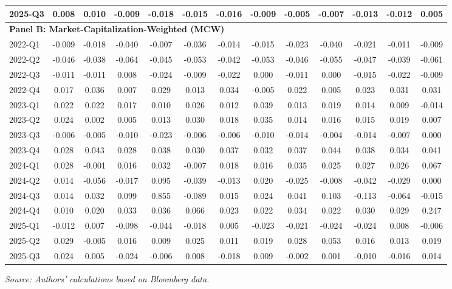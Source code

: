 \documentclass[12pt]{article}
\begin{document}
\begin{table}[htbp]
\begin{adjustbox}{max width=\textwidth}
\begin{tabular}{lcccccccccccc}
2025-Q3 & 0.008 & 0.010 & -0.009 & -0.018 & -0.015 & -0.016 & -0.009 & -0.005 & -0.007 & -0.013 & -0.012 & 0.005 \\
\midrule
\multicolumn{13}{l}{\textbf{Panel B: Market-Capitalization-Weighted (MCW)}} \\
\midrule
2022-Q1 & -0.009 & -0.018 & -0.040 & -0.007 & -0.036 & -0.014 & -0.015 & -0.023 & -0.040 & -0.021 & -0.011 & -0.009 \\
2022-Q2 & -0.046 & -0.038 & -0.064 & -0.045 & -0.053 & -0.042 & -0.053 & -0.046 & -0.055 & -0.047 & -0.039 & -0.061 \\
2022-Q3 & -0.011 & -0.011 & 0.008 & -0.024 & -0.009 & -0.022 & 0.000 & -0.011 & 0.000 & -0.015 & -0.022 & -0.009 \\
2022-Q4 & 0.017 & 0.036 & 0.007 & 0.029 & 0.013 & 0.034 & -0.005 & 0.022 & 0.005 & 0.023 & 0.031 & 0.031 \\
2023-Q1 & 0.022 & 0.022 & 0.017 & 0.010 & 0.026 & 0.012 & 0.039 & 0.013 & 0.019 & 0.014 & 0.009 & -0.014 \\
2023-Q2 & 0.024 & 0.002 & 0.005 & 0.013 & 0.030 & 0.018 & 0.035 & 0.014 & 0.016 & 0.015 & 0.019 & 0.007 \\
2023-Q3 & -0.006 & -0.005 & -0.010 & -0.023 & -0.006 & -0.006 & -0.010 & -0.014 & -0.004 & -0.014 & -0.007 & 0.000 \\
2023-Q4 & 0.028 & 0.043 & 0.028 & 0.038 & 0.030 & 0.037 & 0.032 & 0.037 & 0.044 & 0.038 & 0.034 & 0.041 \\
2024-Q1 & 0.028 & -0.001 & 0.016 & 0.032 & -0.007 & 0.018 & 0.016 & 0.035 & 0.025 & 0.027 & 0.026 & 0.067 \\
2024-Q2 & 0.014 & -0.056 & -0.017 & 0.095 & -0.039 & -0.013 & 0.020 & -0.025 & -0.008 & -0.042 & -0.029 & 0.000 \\
2024-Q3 & 0.014 & 0.032 & 0.099 & 0.855 & -0.089 & 0.015 & 0.024 & 0.041 & 0.103 & -0.113 & -0.064 & -0.015 \\
2024-Q4 & 0.010 & 0.020 & 0.033 & 0.036 & 0.066 & 0.023 & 0.022 & 0.034 & 0.022 & 0.030 & 0.029 & 0.247 \\
2025-Q1 & -0.012 & 0.007 & -0.098 & -0.044 & -0.018 & 0.005 & -0.023 & -0.021 & -0.024 & -0.024 & 0.008 & -0.006 \\
2025-Q2 & 0.029 & -0.005 & 0.016 & 0.009 & 0.025 & 0.011 & 0.019 & 0.028 & 0.053 & 0.016 & 0.013 & 0.019 \\
2025-Q3 & 0.024 & 0.005 & -0.024 & -0.006 & 0.008 & -0.018 & 0.009 & -0.002 & 0.001 & -0.010 & -0.016 & 0.014 \\
\bottomrule
\end{tabular}
\end{adjustbox}
\vspace{2pt}
{\footnotesize \textit{Source: Authors' calculations based on Bloomberg data.}}
\end{table}
\end{document}
